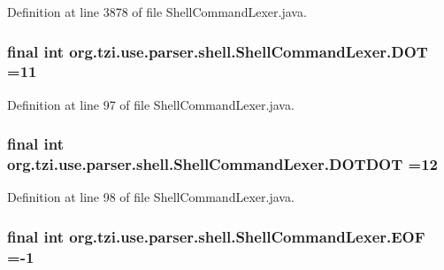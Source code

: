 Definition at line 3878 of file Shell\-Command\-Lexer.\-java.

\hypertarget{classorg_1_1tzi_1_1use_1_1parser_1_1shell_1_1_shell_command_lexer_a7693b072443e5e107b697de9b1e93b27}{
\subsubsection[{D\-O\-T}]{\setlength{\rightskip}{0pt plus 5cm}final int org.\-tzi.\-use.\-parser.\-shell.\-Shell\-Command\-Lexer.\-D\-O\-T =11\hspace{0.3cm}{\ttfamily [static]}}}\label{classorg_1_1tzi_1_1use_1_1parser_1_1shell_1_1_shell_command_lexer_a7693b072443e5e107b697de9b1e93b27}


Definition at line 97 of file Shell\-Command\-Lexer.\-java.

\hypertarget{classorg_1_1tzi_1_1use_1_1parser_1_1shell_1_1_shell_command_lexer_af5b14732ec30f79fb73e91ac45b699a0}{
\subsubsection[{D\-O\-T\-D\-O\-T}]{\setlength{\rightskip}{0pt plus 5cm}final int org.\-tzi.\-use.\-parser.\-shell.\-Shell\-Command\-Lexer.\-D\-O\-T\-D\-O\-T =12\hspace{0.3cm}{\ttfamily [static]}}}\label{classorg_1_1tzi_1_1use_1_1parser_1_1shell_1_1_shell_command_lexer_af5b14732ec30f79fb73e91ac45b699a0}


Definition at line 98 of file Shell\-Command\-Lexer.\-java.

\hypertarget{classorg_1_1tzi_1_1use_1_1parser_1_1shell_1_1_shell_command_lexer_a728c0634218eb51fb4da536b0017af65}{
\subsubsection[{E\-O\-F}]{\setlength{\rightskip}{0pt plus 5cm}final int org.\-tzi.\-use.\-parser.\-shell.\-Shell\-Command\-Lexer.\-E\-O\-F =-\/1\hspace{0.3cm}{\ttfamily [static]}}}\label{classorg_1_1tzi_1_1use_1_1parser_1_1shell_1_1_shell_command_lexer_a728c0634218eb51fb4da536b0017af65}


